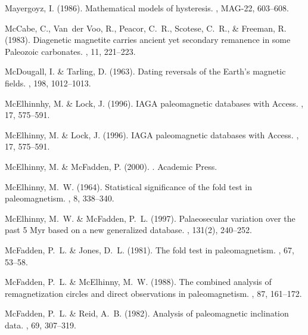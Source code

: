 \documentclass[11pt]{book}
\begin{document}
\begin{thebibliography}{}
Mayergoyz, I. (1986).
\newblock Mathematical models of hysteresis.
, MAG-22, 603--608.

McCabe, C., Van~der Voo, R., Peacor, C.~R., Scotese, C.~R., \& Freeman, R.
  (1983).
\newblock Diagenetic magnetite carries ancient yet secondary remanence in some
  Paleozoic carbonates.
, 11, 221--223.

McDougall, I. \& Tarling, D. (1963).
\newblock Dating reversals of the Earth's magnetic fields.
, 198, 1012--1013.

McElhinnhy, M. \& Lock, J. (1996).
\newblock IAGA paleomagnetic databases with Access.
, 17, 575--591.

McElhinny, M. \& Lock, J. (1996).
\newblock IAGA paleomagnetic databases with Access.
, 17, 575--591.

McElhinny, M. \& McFadden, P. (2000).
.
\newblock Academic Press.

McElhinny, M.~W. (1964).
\newblock Statistical significance of the fold test in paleomagnetism.
, 8, 338--340.

McElhinny, M.~W. \& McFadden, P.~L. (1997).
\newblock Palaeosecular variation over the past 5 Myr based on a new
  generalized database.
, 131(2), 240--252.

McFadden, P.~L. \& Jones, D.~L. (1981).
\newblock The fold test in paleomagnetism.
, 67, 53--58.

McFadden, P.~L. \& McElhinny, M.~W. (1988).
\newblock The combined analysis of remagnetization circles and direct
  observations in paleomagnetism.
, 87, 161--172.

McFadden, P.~L. \& Reid, A.~B. (1982).
\newblock Analysis of paleomagnetic inclination data.
, 69, 307--319.


\end{thebibliography}
\end{document}

